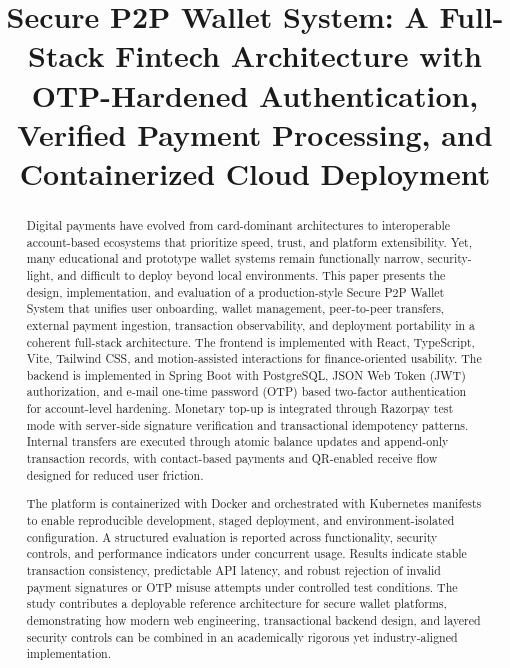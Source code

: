 \documentclass[conference]{IEEEtran}
\begin{document}
\title{Secure P2P Wallet System: A Full-Stack Fintech Architecture with OTP-Hardened Authentication, Verified Payment Processing, and Containerized Cloud Deployment}

\author{%
\and
{}
}

\maketitle

\begin{abstract}
Digital payments have evolved from card-dominant architectures to interoperable account-based ecosystems that prioritize speed, trust, and platform extensibility. Yet, many educational and prototype wallet systems remain functionally narrow, security-light, and difficult to deploy beyond local environments. This paper presents the design, implementation, and evaluation of a production-style Secure P2P Wallet System that unifies user onboarding, wallet management, peer-to-peer transfers, external payment ingestion, transaction observability, and deployment portability in a coherent full-stack architecture. The frontend is implemented with React, TypeScript, Vite, Tailwind CSS, and motion-assisted interactions for finance-oriented usability. The backend is implemented in Spring Boot with PostgreSQL, JSON Web Token (JWT) authorization, and e-mail one-time password (OTP) based two-factor authentication for account-level hardening. Monetary top-up is integrated through Razorpay test mode with server-side signature verification and transactional idempotency patterns. Internal transfers are executed through atomic balance updates and append-only transaction records, with contact-based payments and QR-enabled receive flow designed for reduced user friction.

The platform is containerized with Docker and orchestrated with Kubernetes manifests to enable reproducible development, staged deployment, and environment-isolated configuration. A structured evaluation is reported across functionality, security controls, and performance indicators under concurrent usage. Results indicate stable transaction consistency, predictable API latency, and robust rejection of invalid payment signatures or OTP misuse attempts under controlled test conditions. The study contributes a deployable reference architecture for secure wallet platforms, demonstrating how modern web engineering, transactional backend design, and layered security controls can be combined in an academically rigorous yet industry-aligned implementation.
\end{abstract}
\end{document}
